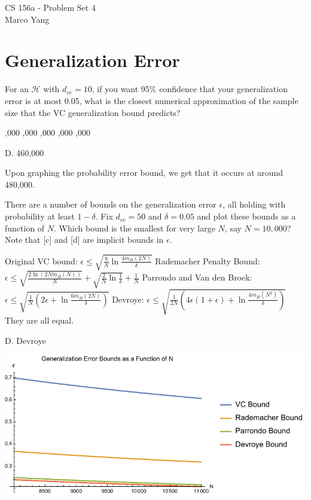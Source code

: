 \documentclass[answers]{exam}
\begin{document}
\begin{center}
{\Large CS 156a - Problem Set 4} \\
\medskip
Marco Yang \\
\bigskip
\end{center}

\section*{Generalization Error}

\begin{questions}
\question
For an $\mathcal{H}$ with $d_{vc} = 10$, if you want 95\% confidence that your generalization 
error is at most 0.05, what is the closest numerical approximation of the sample 
size that the VC generalization bound predicts?
\begin{choices}
    ,000
    ,000
    ,000
    ,000
    ,000
\end{choices}

\begin{solution}
D. 460,000

Upon graphing the probability error bound, we get that it occurs at around
480,000.
\end{solution}

\question
There are a number of bounds on the generalization error $\epsilon$, all holding 
with probability at least $1 - \delta$. Fix $d_{vc} = 50$ and $\delta = 0.05$ and 
plot these bounds as a function of $N$. Which bound is the smallest for very large 
$N$, say $N = 10,000$? Note that [c] and [d] are implicit bounds in $\epsilon$.
\begin{choices}
    \choice Original VC bound: 
    $\epsilon \leq \sqrt{\frac{8}{N} \ln \frac{4m_H(2N)}{\delta}}$
    \choice Rademacher Penalty Bound: 
    $\epsilon \leq \sqrt{\frac{2 \ln(2Nm_H(N))}{N}} + 
    \sqrt{\frac{2}{N} \ln \frac{1}{\delta}} + \frac{1}{N}$
    \choice Parrondo and Van den Broek: 
    $\epsilon \leq \sqrt{\frac{1}{N} \left(2\epsilon + \ln 
    \frac{6m_H(2N)}{\delta}\right)}$
    \choice Devroye: 
    $\epsilon \leq \sqrt{\frac{1}{2N} \left(4\epsilon(1 + \epsilon) + 
    \ln \frac{4m_H(N^2)}{\delta}\right)}$
    \choice They are all equal.
\end{choices}

\begin{solution}
D. Devroye 

\includegraphics[width=\textwidth]{img/p4-2-zoom.pdf}
\end{solution}


\end{questions}
\end{document}
